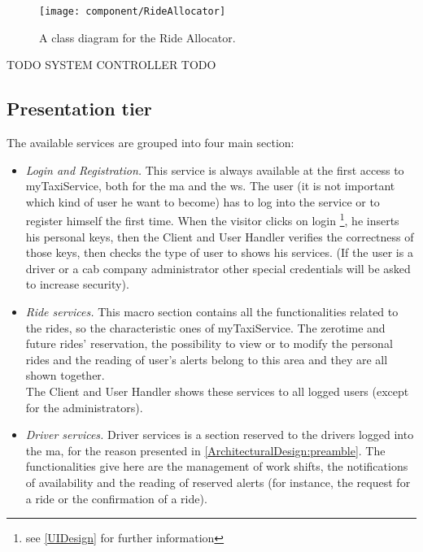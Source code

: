 \documentclass[\mainpath/main]{subfiles}
\begin{document}
\begin{figure}[h!]
	\centering
	\texttt{[image: component/RideAllocator]}
	\caption{A class diagram for the Ride Allocator.}
	\label{ArchitecturalDesign:rideAllocator}
\end{figure}

TODO SYSTEM CONTROLLER TODO\\

\clearpage

\subsection{Presentation tier}
\label{ArchitecturalDesign:services}

The available services are grouped into four main section:\\
\begin{itemize}
	\item \textit{Login and Registration.} This service is always available at the first access to myTaxiService, both for the \gls{ma} and the \gls{ws}. The user (it is not important which kind of user he want to become) has to log into the service or to register himself the first time. When the visitor clicks on login \footnote{see \autoref{UIDesign} for further information}, he inserts his personal keys, then the Client and User Handler verifies the correctness of those keys, then checks the type of user to shows his services. (If the user is a driver or a cab company administrator other special credentials will be asked to increase security).\\
	
	\item \textit{Ride services.} This macro section contains all the functionalities related to the rides, so the characteristic ones of myTaxiService. The zerotime and future rides' reservation, the possibility to view or to modify the personal rides and the reading of user's alerts belong to this area and they are all shown together.\\
	The Client and User Handler shows these services to all logged users (except for the administrators).\\
	
	\item \textit{Driver services.} Driver services is a section reserved to the drivers logged into the \gls{ma}, for the reason presented in \autoref{ArchitecturalDesign:preamble}. The functionalities give here are the management of work shifts, the notifications of availability and the reading of reserved alerts (for instance, the request for a ride or the confirmation of a ride).\\
	

\end{itemize}
\end{document}
